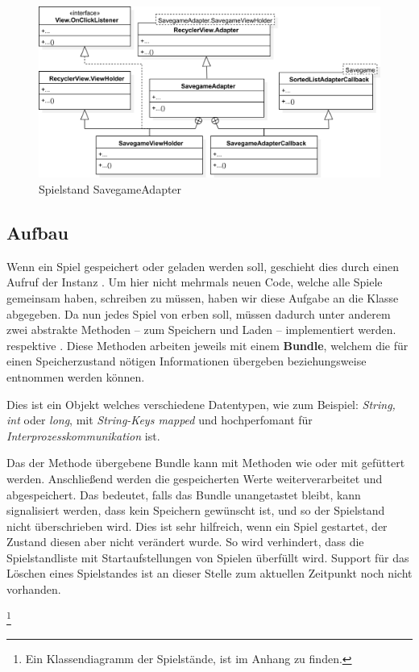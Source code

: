 \begin{figure}[h]
	\centering
	\includegraphics[width=1.0\textwidth]{resources/savegamestorage/SavegameAdapter}
	\caption{Spielstand SavegameAdapter}
\end{figure}

\subsection{Aufbau}
\subsectionauthor{\frank}

Wenn ein Spiel gespeichert oder geladen werden soll, geschieht dies durch einen
Aufruf der Instanz . Um hier nicht mehrmals neuen Code,
welche alle Spiele gemeinsam haben, schreiben zu müssen, haben wir diese
Aufgabe an die Klasse  abgegeben. Da nun jedes Spiel von
 erben soll, müssen dadurch unter anderem zwei abstrakte
Methoden -- zum Speichern und Laden -- implementiert werden.
 respektive . Diese Methoden
arbeiten jeweils mit einem \textbf{Bundle}, welchem die für einen
Speicherzustand nötigen Informationen übergeben beziehungsweise entnommen
werden können.

\begin{mdframed}[frametitle=Erklärung: Bundle]
Dies ist ein Objekt welches verschiedene Datentypen, wie zum Beispiel:
\emph{String, int} oder \emph{long}, mit \emph{String-Keys mapped} und hochperfomant
für \emph{Interprozesskommunikation} ist.
\end{mdframed}

Das der Methode  übergebene Bundle kann mit Methoden wie
 oder  mit gefüttert werden.
Anschließend werden die gespeicherten Werte weiterverarbeitet und
abgespeichert. Das bedeutet, falls das Bundle unangetastet bleibt, kann
signalisiert werden, dass kein Speichern gewünscht ist, und so der Spielstand
nicht überschrieben wird. Dies ist sehr hilfreich, wenn ein Spiel gestartet,
der Zustand diesen aber nicht verändert wurde. So wird verhindert, dass die
Spielstandliste mit Startaufstellungen von Spielen überfüllt wird. Support für
das Löschen eines Spielstandes ist an dieser Stelle zum aktuellen Zeitpunkt
noch nicht vorhanden.

\let\thefootnote\relax\footnote{Ein Klassendiagramm der Spielstände, ist im Anhang zu finden.}